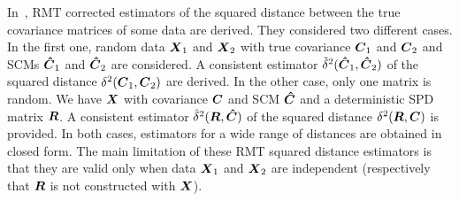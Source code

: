\documentclass{article}
\theoremstyle{plain}
\theoremstyle{definition}
\theoremstyle{remark}
\begin{document}
In~\cite{couillet2019random,pereira2023consistent}, RMT corrected estimators of the squared distance between the true covariance matrices of some data are derived.
They considered two different cases.
In the first one, random data $\boldsymbol{X}_1$ and $\boldsymbol{X}_2$ with true covariance $\boldsymbol{C}_1$ and $\boldsymbol{C}_2$ and SCMs $\boldsymbol{\hat{C}}_1$ and $\boldsymbol{\hat{C}}_2$ are considered.
A consistent estimator $\tilde{\delta}^2(\boldsymbol{\hat{C}}_1,\boldsymbol{\hat{C}}_2)$ of the squared distance $\delta^2(\boldsymbol{C}_1,\boldsymbol{C}_2)$ are derived.
In the other case, only one matrix is random.
We have $\boldsymbol{X}$ with covariance $\boldsymbol{C}$ and SCM $\boldsymbol{\hat{C}}$ and a deterministic SPD matrix $\boldsymbol{R}$.
A consistent estimator $\hat{\delta}^2(\boldsymbol{R},\boldsymbol{\hat{C}})$ of the squared distance $\delta^2(\boldsymbol{R},\boldsymbol{C})$ is provided.
In both cases, estimators for a wide range of distances are obtained in closed form.
%
The main limitation of these RMT squared distance estimators is that they are valid only when data $\boldsymbol{X}_1$ and $\boldsymbol{X}_2$ are independent (respectively that $\boldsymbol{R}$ is not constructed with $\boldsymbol{X}$).

\end{document}
